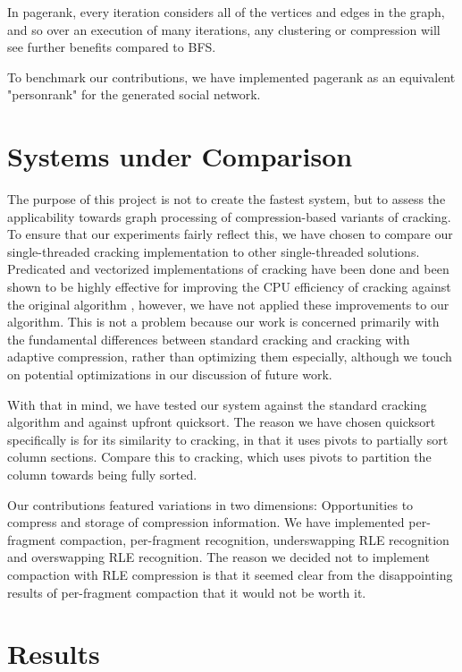 In pagerank, every iteration considers all of the vertices and edges in the graph, and so over an execution of many iterations, any clustering or compression will see further benefits compared to BFS.

To benchmark our contributions, we have implemented pagerank as an equivalent "personrank" for the generated social network.

\section{Systems under Comparison}

The purpose of this project is not to create the fastest system, but to assess the applicability towards graph processing of compression-based variants of cracking. To ensure that our experiments fairly reflect this, we have chosen to compare our single-threaded cracking implementation to other single-threaded solutions. Predicated and vectorized implementations of cracking have been done and been shown to be highly effective for improving the CPU efficiency of cracking against the original algorithm \cite{Pirk:2014:DCF:2619228.2619232}, however, we have not applied these improvements to our algorithm. This is not a problem because our work is concerned primarily with the fundamental differences between standard cracking and cracking with adaptive compression, rather than optimizing them especially, although we touch on potential optimizations in our discussion of future work.

With that in mind, we have tested our system against the standard cracking algorithm and against upfront quicksort. The reason we have chosen quicksort specifically is for its similarity to cracking, in that it uses pivots to partially sort column sections. Compare this to cracking, which uses pivots to partition the column towards being fully sorted.

Our contributions featured variations in two dimensions: Opportunities to compress and storage of compression information. We have implemented per-fragment compaction, per-fragment recognition, underswapping RLE recognition and overswapping RLE recognition. The reason we decided not to implement compaction with RLE compression is that it seemed clear from the disappointing results of per-fragment compaction that it would not be worth it.

\section{Results}

